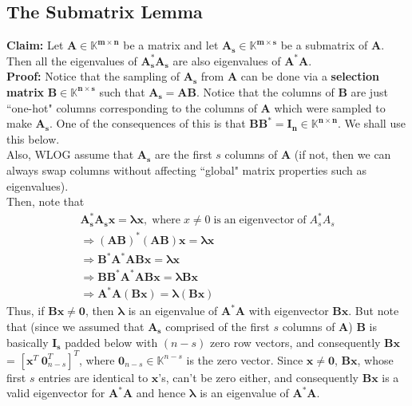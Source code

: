 \documentclass[a4paper,11pt]{article}
\numberwithin{definition}{section}
\numberwithin{mytheorem}{subsection}
\begin{document}
\subsection{The Submatrix Lemma}
\textbf{Claim: } Let $\boldsymbol{A \in \mathbb{K}^{m\times n}}$ be a matrix and let $\boldsymbol{A_s \in \mathbb{K}^{m\times s}}$ be a submatrix of $\boldsymbol{A}$. Then all the eigenvalues of $\boldsymbol{A_s^{*}A_s}$ are also eigenvalues of $\boldsymbol{A^{*}A}$.\\
\textbf{Proof: } Notice that the sampling of $\boldsymbol{A_s}$ from $\boldsymbol{A}$ can be done via a \textbf{selection matrix} $\boldsymbol{B\in\mathbb{K}^{n\times s}}$ such that $\boldsymbol{A_s = AB}$. Notice that the columns of $\boldsymbol{B}$ are just ``one-hot" columns corresponding to the columns of $\boldsymbol{A}$ which were sampled to make $\boldsymbol{A_s}$. One of the consequences of this is that $\boldsymbol{BB^* = I_n \in \mathbb{K}^{n\times n}}$. We shall use this below.\\
Also, WLOG assume that $\boldsymbol{A_s}$ are the first $s$ columns of $\boldsymbol{A}$ (if not, then we can always swap columns without affecting ``global" matrix properties such as eigenvalues).\\
Then, note that 
\begin{gather*}
    \boldsymbol{A_s^*A_sx = \lambda x},\;\mathrm{where}\;x\neq 0\;\mathrm{is}\;\mathrm{an}\;\mathrm{eigenvector}\;\mathrm{of}\;A_s^*A_s \\
    \Rightarrow \boldsymbol{(AB)^*(AB)x = \lambda x} \\
    \Rightarrow \boldsymbol{B^*A^*ABx = \lambda x} \\
    \Rightarrow \boldsymbol{BB^*A^*ABx = \lambda Bx} \\
    \Rightarrow \boldsymbol{A^*A(Bx) = \lambda (Bx)}
\end{gather*}
Thus, if $\boldsymbol{Bx \neq 0}$, then $\boldsymbol{\lambda}$ is an eigenvalue of $\boldsymbol{A^*A}$ with eigenvector $\boldsymbol{Bx}$. But note that (since we assumed that $\boldsymbol{A_s}$ comprised of the first $s$ columns of $\boldsymbol{A}$) $\boldsymbol{B}$ is basically $\boldsymbol{I_s}$ padded below with $(n-s)$ zero row vectors, and consequently $\boldsymbol{Bx}$ = $[\boldsymbol{x}^T\;\boldsymbol{0}^T_{n-s}]^T$, where $\boldsymbol{0}_{n-s}\in\mathbb{K}^{n-s}$ is the zero vector. Since $\boldsymbol{x\neq 0}$, $\boldsymbol{Bx}$, whose first $s$ entries are identical to $\boldsymbol{x}$'s, can't be zero either, and consequently $\boldsymbol{Bx}$ is a valid eigenvector for $\boldsymbol{A^*A}$ and hence $\boldsymbol{\lambda}$ is an eigenvalue of $\boldsymbol{A^*A}$.\\
\end{document}
